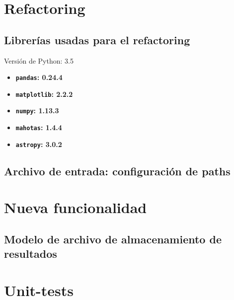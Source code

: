 \begin{appendix}
\section{Refactoring}
\subsection{Librer\'ias usadas para el refactoring}
\label{subs:a0}
Versi\'on de Python: 3.5
\begin{itemize}
\item \textbf{\texttt{pandas}: 0.24.4}
\item \textbf{\texttt{matplotlib}: 2.2.2}
\item \textbf{\texttt{numpy}: 1.13.3}
\item \textbf{\texttt{mahotas}: 1.4.4}
\item \textbf{\texttt{astropy}: 3.0.2}
\end{itemize}
\subsection{Archivo de entrada: configuraci\'on de paths}
\label{subs:a1}
\section{Nueva funcionalidad}
\subsection{Modelo de archivo de almacenamiento de resultados}

\section{Unit-tests}

\end{appendix}
